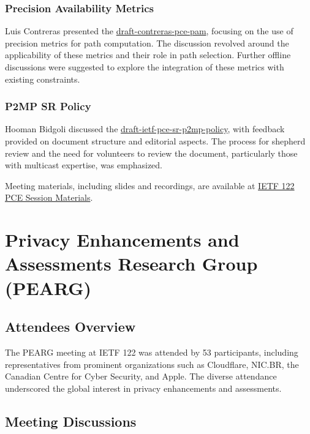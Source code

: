 \documentclass{article}
\begin{document}
\subsubsection{Precision Availability Metrics}
Luis Contreras presented the \href{https://datatracker.ietf.org/doc/draft-contreras-pce-pam/}{draft-contreras-pce-pam}, focusing on the use of precision metrics for path computation. The discussion revolved around the applicability of these metrics and their role in path selection. Further offline discussions were suggested to explore the integration of these metrics with existing constraints.

\subsubsection{P2MP SR Policy}
Hooman Bidgoli discussed the \href{https://datatracker.ietf.org/doc/draft-ietf-pce-sr-p2mp-policy/}{draft-ietf-pce-sr-p2mp-policy}, with feedback provided on document structure and editorial aspects. The process for shepherd review and the need for volunteers to review the document, particularly those with multicast expertise, was emphasized.

Meeting materials, including slides and recordings, are available at \href{https://datatracker.ietf.org/meeting/122/session/pce}{IETF 122 PCE Session Materials}.




\newpage

\section{Privacy Enhancements and Assessments Research Group (PEARG)}

\subsection{Attendees Overview}
The PEARG meeting at IETF 122 was attended by 53 participants, including representatives from prominent organizations such as Cloudflare, NIC.BR, the Canadian Centre for Cyber Security, and Apple. The diverse attendance underscored the global interest in privacy enhancements and assessments.

\subsection{Meeting Discussions}
\end{document}

